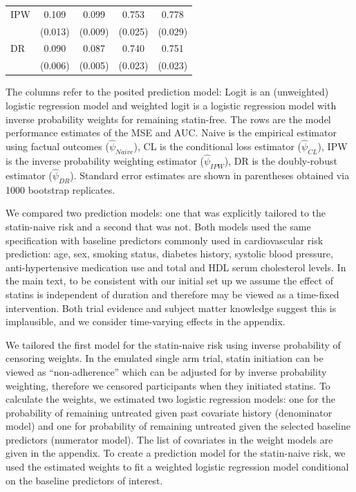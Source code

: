 \begin{table}[t]
\begin{threeparttable}
\begin{tabular}{lcccc}
        IPW & 0.109 & 0.099 & 0.753 & 0.778\\
         & (0.013) & (0.009) & (0.025) & (0.029)\\
        DR & 0.090 & 0.087 & 0.740 & 0.751\\
         & (0.006) & (0.005) & (0.023) & (0.023)\\
        \bottomrule
        \end{tabular}
        \centering
        \begin{tablenotes}[flushleft]
        \item The columns refer to the posited prediction model: Logit is an (unweighted) logistic regression model and weighted logit is a logistic regression model with inverse probability weights for remaining statin-free. The rows are the model performance estimates of the MSE and AUC. Naive is the empirical estimator using factual outcomes ($\widehat{\psi}_{Naive}$), CL is the conditional loss estimator ($\widehat{\psi}_{CL}$), IPW is the inverse probability weighting estimator ($\widehat{\psi}_{IPW}$), DR is the doubly-robust estimator ($\widehat{\psi}_{DR}$). Standard error estimates are shown in parentheses obtained via 1000 bootstrap replicates.
        \end{tablenotes}
        \end{threeparttable}
\end{table}

We compared two prediction models: one that was explicitly tailored to the statin-naive risk and a second that was not. Both models used the same specification with baseline predictors commonly used in cardiovascular risk prediction: age, sex, smoking status, diabetes history, systolic blood pressure, anti-hypertensive medication use and total and HDL serum cholesterol levels. In the main text, to be consistent with our initial set up we assume the effect of statins is independent of duration and therefore may be viewed as a time-fixed intervention. Both trial evidence and subject matter knowledge suggest this is implausible, and we consider time-varying effects in the appendix.

We tailored the first model for the statin-naive risk using inverse probability of censoring weights. In the emulated single arm trial, statin initiation can be viewed as ``non-adherence'' which can be adjusted for by inverse probability weighting, therefore we censored participants when they initiated statins. To calculate the weights, we estimated two logistic regression models: one for the probability of remaining untreated given past covariate history (denominator model) and one for probability of remaining untreated given the selected baseline predictors (numerator model). The list of covariates in the weight models are given in the appendix. To create a prediction model for the statin-naive risk, we used the estimated weights to fit a weighted logistic regression model conditional on the baseline predictors of interest. 

